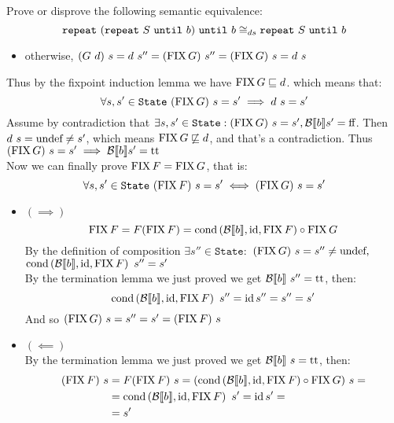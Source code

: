 \begin{exercise}{
    Prove or disprove the following semantic equivalence:
    \[ \texttt{repeat}\ (\texttt{repeat}\ S\ \texttt{until}\ b)\ \texttt{until}\ b \cong_{ds} \texttt{repeat}\ S\ \texttt{until}\ b \]
}
\begin{itemize}
\begin{itemize}
                \item otherwise, $(G\ d)\ s = d\ s'' = (\operatorname{FIX} G)\ s'' = (\operatorname{FIX} G)\ s = d\ s$
            \end{itemize}
    \end{itemize}
    Thus by the fixpoint induction lemma we have $\operatorname{FIX} G \sqsubseteq d$. which means that:
    \[ \forall s, s' \in \texttt{State}\ (\FIX G)\ s = s' \implies d\ s = s' \]
    Assume by contradiction that $\exists s, s' \in \texttt{State} : (\operatorname{FIX} G)\ s = s', \mathcal{B} \llbracket b \rrbracket s' = \text{ff} $. Then $d\ s = \undef \neq s'$, which means $\operatorname{FIX} G \not\sqsubseteq d$, and that's a contradiction. Thus $(\operatorname{FIX} G)\ s = s' \implies \mathcal{B} \llbracket b \rrbracket s' = \text{tt}$ \\
    Now we can finally prove $\operatorname{FIX} F = \operatorname{FIX} G$, that is:
    \[ \forall s, s' \in \texttt{State}\ (\operatorname{FIX} F)\ s = s' \iff (\operatorname{FIX} G)\ s = s' \]
    \begin{itemize}
        \item $(\implies)$
            \[ \operatorname{FIX} F = F(\operatorname{FIX} F) = \operatorname{cond}\left(\mathcal{B} \llbracket b \rrbracket, \operatorname{id}, \operatorname{FIX} F\right) \circ \operatorname{FIX} G \]
            By the definition of composition $\exists s'' \in \texttt{State} :$ $(\operatorname{FIX} G)\ s = s'' \neq \text{undef},$ \\ $\operatorname{cond}\left(\mathcal{B} \llbracket b \rrbracket, \operatorname{id}, \operatorname{FIX} F\right)\ s'' = s'$ \\
            By the termination lemma we just proved we get $\mathcal{B} \llbracket b \rrbracket\ s'' = \text{tt}$, then:
            \[ \operatorname{cond}\left(\mathcal{B} \llbracket b \rrbracket, \operatorname{id}, \operatorname{FIX} F\right)\ s'' = \operatorname{id} s'' = s'' = s' \]
            And so $(\operatorname{FIX} G)\ s = s'' = s' = (\operatorname{FIX} F)\ s$
        \item $(\impliedby)$ \\
            By the termination lemma we just proved we get $\mathcal{B} \llbracket b \rrbracket\ s = \text{tt}$, then:
            \begin{align*}
                (\operatorname{FIX} F)\ s &= F(\operatorname{FIX} F)\ s = (\operatorname{cond}\left(\mathcal{B} \llbracket b \rrbracket, \operatorname{id}, \operatorname{FIX} F\right) \circ \operatorname{FIX} G)\ s = \\
                &= \operatorname{cond}\left(\mathcal{B} \llbracket b \rrbracket, \operatorname{id}, \operatorname{FIX} F\right)\ s' = \operatorname{id} s' = \\
                &= s'
            \end{align*}
    \end{itemize}
\end{exercise}
